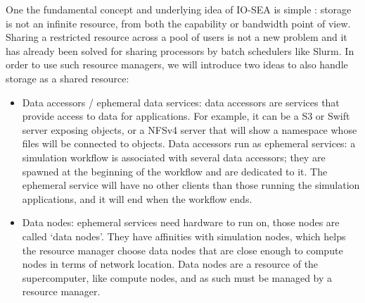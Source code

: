 One the fundamental concept and underlying idea of IO-SEA is simple : storage is not an infinite resource, 
from both the capability or bandwidth point of view.   Sharing a restricted resource across a pool of users is
not a new problem and it has already been solved for sharing processors by batch schedulers like Slurm. In order
to use such resource managers, we will introduce two ideas to also handle storage as a shared resource:
\begin{itemize}
    \item Data accessors / ephemeral data services: data accessors are services that provide access to data for applications. For example, it can be a S3 or Swift server exposing objects, or a NFSv4 server that will show a namespace whose files will be connected to objects. Data accessors run as ephemeral services: a simulation workflow is associated with several data accessors; they are spawned at the beginning of the workflow and are dedicated to it. The ephemeral service will have no other clients than those running the simulation applications, and it will end when the workflow ends.
    
    \item Data nodes: ephemeral services need hardware to run on, those nodes are called ‘data nodes’. They have affinities with simulation nodes, which helps the resource manager choose data nodes that are close enough to compute nodes in terms of network location. Data nodes are a resource of the supercomputer, like compute nodes, and as such must be managed by a resource manager.
\end{itemize}
 
